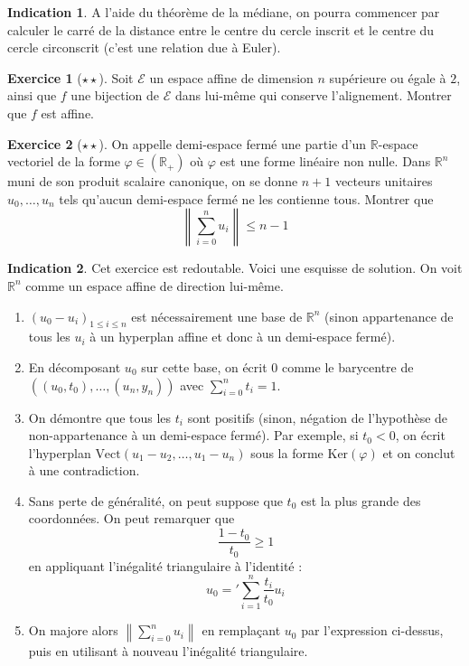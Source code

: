 \documentclass[french]{book}
\newcommand{\R}{\mathbb{R}}
\renewcommand{\ker}{\text{Ker}}
\theoremstyle{definition}
\newtheorem{ex}{Exercice}[chapter]
\theoremstyle{theorem}
\newtheorem*{ind}{Indication}
\theoremstyle{remark}
\begin{document}
\begin{ind}
	A l'aide du théorème de la médiane, on pourra commencer par calculer le carré de la distance entre le centre du cercle inscrit et le centre du cercle circonscrit (c'est une relation due à Euler).
\end{ind}

\begin{ex}[$\star\star$]
	Soit $\mathcal{E}$ un espace affine de dimension $n$ supérieure ou égale à $2$, ainsi que $f$ une bijection de $\mathcal{E}$ dans lui-même qui conserve l'alignement. Montrer que $f$ est affine.
\end{ex}

\begin{ex}[$\star\star$]
	On appelle demi-espace fermé une partie d'un $\R$-espace vectoriel de la forme $\varphi\in(\R_+)$ où $\varphi$ est une forme linéaire non nulle. Dans $\R^n$ muni de son produit scalaire canonique, on se donne $n+1$ vecteurs unitaires $u_0,\ldots,u_n$ tels qu'aucun demi-espace fermé ne les contienne tous. Montrer que $$\left\lVert\sum_{i=0}^{n}u_i\right\rVert\leqslant n-1$$
\end{ex}

\begin{ind}
	Cet exercice est redoutable. Voici une esquisse de solution. On voit $\R^n$ comme un espace affine de direction lui-même.
	\begin{enumerate}
		\item $(u_0-u_i)_{1\leqslant i\leqslant n}$ est nécessairement une base de $\R^n$ (sinon appartenance de tous les $u_i$ à un hyperplan affine et donc à un demi-espace fermé).
		\item En décomposant $u_0$ sur cette base, on écrit $0$ comme le barycentre de $((u_0,t_0),\ldots,(u_n,y_n))$ avec $\displaystyle\sum_{i=0}^{n}t_i=1$.
		\item On démontre que tous les $t_i$ sont positifs (sinon, négation de l'hypothèse de non-appartenance à un demi-espace fermé). Par exemple, si $t_0<0$, on écrit l'hyperplan $\text{Vect}(u_1-u_2,\ldots,u_1-u_n)$ sous la forme $\ker(\varphi)$ et on conclut à une contradiction.
		\item Sans perte de généralité, on peut suppose que $t_0$ est la plus grande des coordonnées. On peut remarquer que $$\frac{1-t_0}{t_0}\geqslant 1$$ en appliquant l'inégalité triangulaire à l'identité : $$u_0='\sum_{i=1}^{n}\frac{t_i}{t_0}u_i$$
		\item On majore alors $\displaystyle\left\lVert\sum_{i=0}^{n}u_i\right\rVert$ en remplaçant $u_0$ par l'expression ci-dessus, puis en utilisant à nouveau l'inégalité triangulaire. 
	\end{enumerate}
\end{ind}
\end{document}
